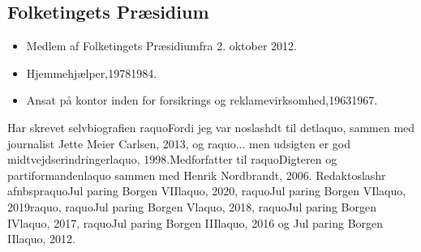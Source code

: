 \documentclass[11pt, a4paper]{awesome-cv}
\begin{document}
\begin{cvletter}
\subsection*{Folketingets Præsidium}
\begin{itemize}
\item Medlem af Folketingets Præsidiumfra 2. oktober 2012.
\end{itemize}
\begin{itemize}
\item Hjemmehjælper,19781984.
\item Ansat på kontor inden for forsikrings og reklamevirksomhed,19631967.
\end{itemize}
Har skrevet selvbiografien raquoFordi jeg var noslashdt til detlaquo, sammen med journalist Jette Meier Carlsen, 2013, og raquo... men udsigten er god  midtvejdserindringerlaquo, 1998.Medforfatter til raquoDigteren og partiformandenlaquo sammen med Henrik Nordbrandt, 2006. Redaktoslashr afnbspraquoJul paring Borgen VIIlaquo, 2020, raquoJul paring Borgen VIlaquo, 2019raquo, raquoJul paring Borgen Vlaquo, 2018, raquoJul paring Borgen IVlaquo, 2017, raquoJul paring Borgen IIIlaquo, 2016 og Jul paring Borgen IIlaquo, 2012.

\end{cvletter}
\end{document}
